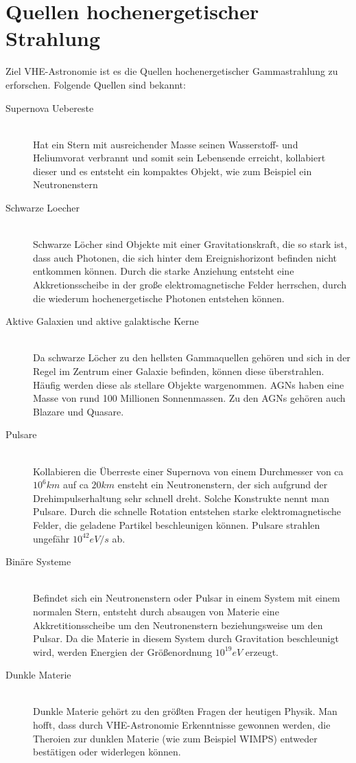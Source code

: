 \section{Quellen hochenergetischer Strahlung}
Ziel VHE-Astronomie ist es die Quellen hochenergetischer Gammastrahlung zu erforschen. Folgende Quellen sind bekannt:

\begin{description}
\item[Supernova Uebereste]\hfill \\
Hat ein Stern mit ausreichender Masse seinen Wasserstoff- und Heliumvorat verbrannt und somit sein Lebensende erreicht, kollabiert dieser und es entsteht ein kompaktes Objekt, wie zum Beispiel ein Neutronenstern
\item[Schwarze Loecher]\hfill \\
Schwarze Löcher sind Objekte mit einer Gravitationskraft, die so stark ist, dass auch Photonen, die sich hinter dem Ereignishorizont befinden nicht entkommen können. Durch die starke Anziehung entsteht eine Akkretionsscheibe in der große elektromagnetische Felder herrschen, durch die wiederum hochenergetische Photonen entstehen können.
\item[Aktive Galaxien und aktive galaktische Kerne]\hfill \\
Da schwarze Löcher zu den hellsten Gammaquellen gehören und sich in der Regel im Zentrum einer Galaxie befinden, können diese überstrahlen. Häufig werden diese als stellare Objekte wargenommen. AGNs haben eine Masse von rund 100 Millionen Sonnenmassen. Zu den AGNs gehören auch Blazare und Quasare.
\item[Pulsare]\hfill \\
Kollabieren die Überreste einer Supernova von einem Durchmesser von ca $10^6km$ auf ca $20km$ ensteht ein Neutronenstern, der sich aufgrund der Drehimpulserhaltung sehr schnell dreht. Solche Konstrukte nennt man Pulsare. Durch die schnelle Rotation entstehen starke elektromagnetische Felder, die geladene Partikel beschleunigen können. Pulsare strahlen ungefähr $10^42eV/s$ ab.
\item[Binäre Systeme]\hfill \\ 
Befindet sich ein Neutronenstern oder Pulsar in einem System mit einem normalen Stern, entsteht durch absaugen von Materie eine Akkretitionsscheibe um den Neutronenstern beziehungsweise um den Pulsar. Da die Materie in diesem System durch Gravitation beschleunigt wird, werden Energien der Größenordnung $10^19 eV$ erzeugt. 
\item[Dunkle Materie]\hfill \\
Dunkle Materie gehört zu den größten Fragen der heutigen Physik. Man hofft, dass durch VHE-Astronomie Erkenntnisse gewonnen werden, die Theroien zur dunklen Materie (wie zum Beispiel WIMPS) entweder bestätigen oder widerlegen können.
\end{description}


